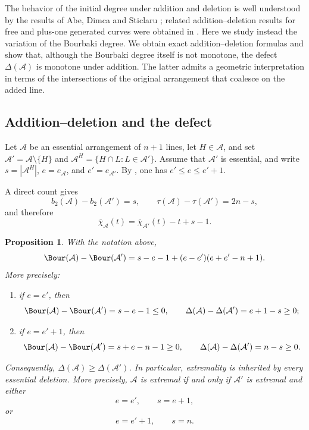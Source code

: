 \documentclass[11pt]{amsart}   %
\newtheorem{Proposition}[Theorem]{Proposition}
\theoremstyle{definition}
\def\A{{\mathcal A}}
\begin{document}
The behavior of the initial degree under addition and deletion is well understood by the results of Abe, Dimca and Sticlaru \cite{Abe-Dimca-Stic}; related addition--deletion results for free and plus-one generated curves were obtained in \cite{Macinic-Pokora-addition}. Here we study instead the variation of the Bourbaki degree. We obtain exact addition--deletion formulas and show that, although the Bourbaki degree itself is not monotone, the defect $\Delta(\A)$ is monotone under addition. The latter admits a geometric interpretation in terms of the intersections of the original arrangement that coalesce on the added line.

\subsection{Addition--deletion and the defect}
\label{subsec:deletion-line}

Let $\A$ be an essential arrangement of $n+1$ lines, let $H\in\A$, and set $\A'=\A\setminus\{H\}$ and $\A^H=\{H\cap L:L\in\A'\}$. Assume that $\A'$ is essential, and write $s=|\A^H|$, $e=e_\A$, and $e'=e_{\A'}$. By \cite[Proposition~2.12(1)]{Abe-Dimca-Stic}, one has $e'\leq e\leq e'+1$.

A direct count gives
\[
b_2(\A)-b_2(\A')=s,
\qquad
\tau(\A)-\tau(\A')=2n-s,
\]
and therefore
\begin{equation}
\label{eq:reduced-characteristic-deletion}
\overline{\chi}_\A(t)
=
\overline{\chi}_{\A'}(t)-t+s-1.
\end{equation}

\begin{Proposition}
\label{prop:bourbaki-deletion-formula}
With the notation above,
\begin{equation}
\label{eq:general-bourbaki-deletion-formula}
\Bour(\A)-\Bour(\A')
=
s-e-1+(e-e')(e+e'-n+1).
\end{equation}
More precisely:
\begin{enumerate}
\item if $e=e'$, then
\[
\Bour(\A)-\Bour(\A')=s-e-1\leq0,
\qquad
\Delta(\A)-\Delta(\A')=e+1-s\geq0;
\]

\item if $e=e'+1$, then
\[
\Bour(\A)-\Bour(\A')=s+e-n-1\geq0,
\qquad
\Delta(\A)-\Delta(\A')=n-s\geq0.
\]
\end{enumerate}
Consequently, $\Delta(\A)\geq\Delta(\A')$. In particular, extremality is inherited by every essential deletion. More precisely, $\A$ is extremal if and only if $\A'$ is extremal and either
\[
e=e',\qquad s=e+1,
\]
or
\[
e=e'+1,\qquad s=n.
\]
\end{Proposition}
\end{document}

